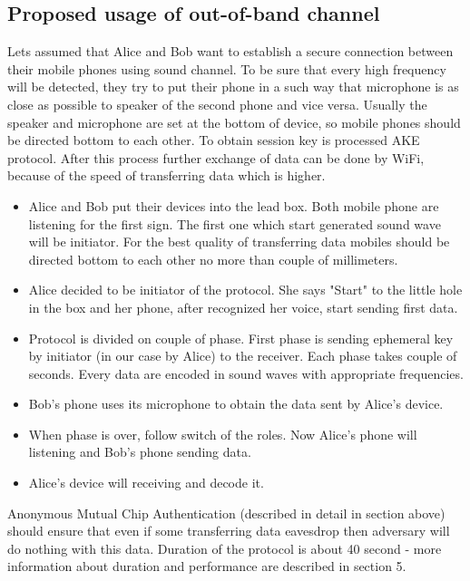 \documentclass[11pt,titlepage]{article}
\theoremstyle{plain}
\begin{document}
\subsection{Proposed usage of out-of-band channel}

Lets assumed that Alice and Bob want to establish a secure connection between their mobile phones using sound channel. To be sure that every high frequency will be detected, they try to put their phone in a such way that microphone is as close as possible to speaker of the second phone and vice versa. Usually the speaker and microphone are set at the bottom of device, so mobile phones should be directed bottom to each other. To obtain session key is processed AKE protocol. After this process further exchange of data can be done by WiFi, because of the speed of transferring data which is higher. 

\vspace{5mm}

\begin{itemize}
\item Alice and Bob put their devices into the lead box. Both mobile phone are listening for the first sign. The first one which start generated sound wave will be initiator. For the best quality of transferring data mobiles should be directed bottom to each other no more than couple of millimeters.
\item Alice decided to be initiator of the protocol. She says "Start" to the little hole in the box and her phone, after recognized her voice, start sending first data.
\item Protocol is divided on couple of phase. First phase is sending ephemeral key by initiator (in our case by Alice) to the receiver. Each phase takes couple of seconds. Every data are encoded in sound waves with appropriate frequencies.
\item Bob's phone uses its microphone to obtain the data sent by Alice's device.
\item When phase is over, follow switch of the roles. Now Alice's phone will listening and Bob's phone sending data.
\item Alice's device will receiving and decode it.
\end{itemize}

Anonymous Mutual Chip Authentication (described in detail in section above) should ensure that even if some transferring data eavesdrop then adversary will do nothing with this data. Duration of the protocol is about 40 second - more information about duration and performance are described in section 5.
\end{document}
